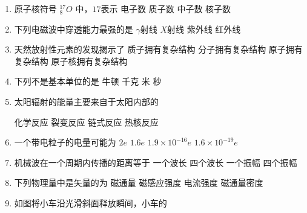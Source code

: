 




\gaokaoxz


\begin{enumerate}
	\item
原子核符号 $^{17}_{8} O $ 中，$ 17  $表示  
\fourchoices
{电子数}
{质子数}
{中子数}
{核子数}



\item
下列电磁波中穿透能力最强的是  
\fourchoices
{$ \gamma $射线}
{$ X $射线}
{紫外线}
{红外线}


\item 
天然放射性元素的发现揭示了  
\fourchoices
{质子拥有复杂结构}
{分子拥有复杂结构}
{原子拥有复杂结构}
{原子核拥有复杂结构}



\item
下列不是基本单位的是  
\fourchoices
{牛顿}
{千克}
{米}
{秒}


\item 
太阳辐射的能量主要来自于太阳内部的 

\fourchoices
{化学反应}
{裂变反应}
{链式反应}
{热核反应}




\item
一个带电粒子的电量可能为 
\fourchoices
{$2 e$}
{$1.6 e$}
{$1.9 \times 10^{-16} e$}
{$1.6 \times 10^{-19} e$}






 
\item 
机械波在一个周期内传播的距离等于  
\fourchoices
{一个波长}
{四个波长}
{一个振幅}
{四个振幅}



\item
下列物理量中是矢量的为  
\fourchoices
{磁通量}
{磁感应强度}
{电流强度}
{磁通量密度}


\item 
如图将小车沿光滑斜面释放瞬间，小车的  
\begin{figure}[h!]
	\centering
	
\end{figure}


\end{enumerate}
